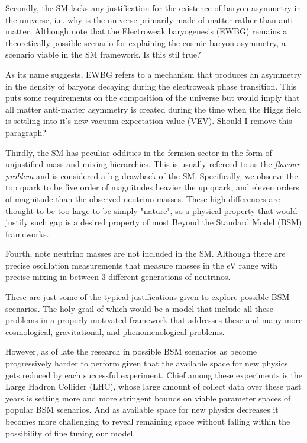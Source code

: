 Secondly, the SM lacks any justification for the existence of baryon asymmetry in the universe, i.e. why is the universe primarily made of matter rather than anti-matter. Although note that the Electroweak baryogenesis (EWBG) remains a theoretically possible scenario for explaining the cosmic baryon asymmetry, a scenario viable in the SM framework. {\color{blue} Is this stil true?}

{\color{gray} As its name suggests, EWBG refers to a mechanism that produces an asymmetry in the density of baryons decaying during the electroweak phase transition. This puts some requirements on the composition of the universe but would imply that all matter anti-matter asymmetry is created during the time when the Higgs field is settling into it's new vacuum expectation value (VEV). } 
{\color{blue} Should I remove this paragraph?}

Thirdly, the SM has peculiar oddities in the fermion sector in the form of unjustified mass and mixing hierarchies. This is usually refereed to as the \textit{flavour problem} and is considered a big drawback of the SM. { \color{gray} Specifically, we observe the top quark to be five order of magnitudes heavier the up quark, and eleven orders of magnitude than the observed neutrino masses.} These high differences are thought to be too large to be simply "nature", so a physical property that would justify such gap is a desired property of most Beyond the Standard Model (BSM) frameworks. 

Fourth, note neutrino masses are not included in the 
SM. Although there are precise oscillation measurements that measure masses in the eV range with precise mixing in between 3 different generations of neutrinos. 

These are just some of the typical justifications given to explore possible BSM scenarios. The holy grail of which would be a model that include all these problems in a properly motivated framework that addresses these and many more cosmological, gravitational, and phenomenological problems.  

However, as of late the research in possible BSM scenarios as become progressively harder to perform given that the available space for new physics gets reduced by each successful experiment. Chief among these experiments is the Large Hadron Collider (LHC), whose large amount of collect data over these past years is setting more and more stringent bounds on viable parameter spaces of popular BSM scenarios. And as available space for new physics decreases it becomes more challenging to reveal remaining space without falling within the possibility of fine tuning our model.  

